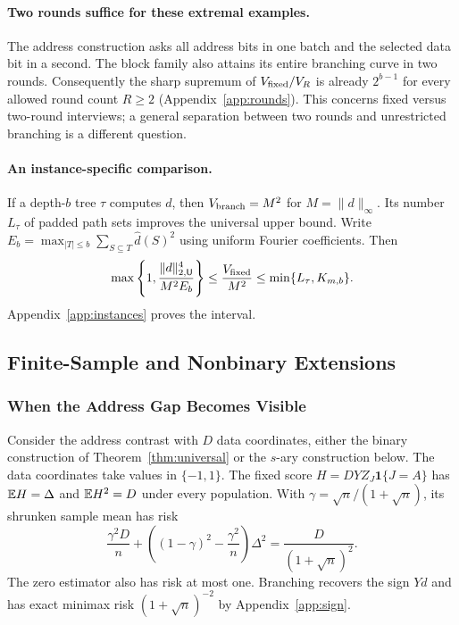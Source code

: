 \paragraph{Two rounds suffice for these extremal examples.}
The address construction asks all address bits in one batch and the selected data bit in a second. The block family also attains its entire branching curve in two rounds. Consequently the sharp supremum of $V_{\rm fixed}/V_R$ is already $2^{b-1}$ for every allowed round count $R\ge2$ (Appendix~\ref{app:rounds}). This concerns fixed versus two-round interviews; a general separation between two rounds and unrestricted branching is a different question.


\paragraph{An instance-specific comparison.}
If a depth-$b$ tree $\tau$ computes $d$, then $V_{\rm branch}=M^2$ for $M=\|d\|_\infty$. Its number $L_\tau$ of padded path sets improves the universal upper bound. Write $E_b=\max_{|T|\le b}\sum_{S\subseteq T}\widehat d(S)^2$ using uniform Fourier coefficients. Then
\[
 \max\left\{1,\frac{\|d\|_{2,\mathsf U}^4}{M^2 E_b}\right\}
 \le\frac{V_{\rm fixed}}{M^2}\le\min\{L_\tau,K_{m,b}\}.
\]
Appendix~\ref{app:instances} proves the interval.


\subsection{Finite-Sample and Nonbinary Extensions}\label{app:extensions}
\subsubsection{When the Address Gap Becomes Visible}\label{app:addressfinite}
Consider the address contrast with $D$ data coordinates, either the binary construction of Theorem~\ref{thm:universal} or the $s$-ary construction below. The data coordinates take values in $\{-1,1\}$. The fixed score $H=DYZ_J\mathbf1\{J=A\}$ has $\mathbb{E} H=\Delta$ and $\mathbb{E} H^2=D$ under every population. With $\gamma=\sqrt n/(1+\sqrt n)$, its shrunken sample mean has risk
\[
 \frac{\gamma^2D}{n}+\left((1-\gamma)^2-\frac{\gamma^2}{n}\right)\Delta^2
   =\frac{D}{(1+\sqrt n)^2}.
\]
The zero estimator also has risk at most one. Branching recovers the sign $Yd$ and has exact minimax risk $(1+\sqrt n)^{-2}$ by Appendix~\ref{app:sign}.

